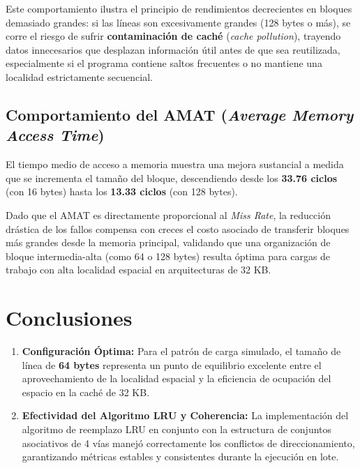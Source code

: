 \documentclass[12pt,a4paper]{article}
\begin{document}
Este comportamiento ilustra el principio de rendimientos decrecientes en bloques demasiado grandes: si las líneas son excesivamente grandes (128 bytes o más), se corre el riesgo de sufrir \textbf{contaminación de caché} (\textit{cache pollution}), trayendo datos innecesarios que desplazan información útil antes de que sea reutilizada, especialmente si el programa contiene saltos frecuentes o no mantiene una localidad estrictamente secuencial.

\subsection{Comportamiento del AMAT (\textit{Average Memory Access Time})}
El tiempo medio de acceso a memoria muestra una mejora sustancial a medida que se incrementa el tamaño del bloque, descendiendo desde los \textbf{33.76 ciclos} (con 16 bytes) hasta los \textbf{13.33 ciclos} (con 128 bytes).

Dado que el AMAT es directamente proporcional al \textit{Miss Rate}, la reducción drástica de los fallos compensa con creces el costo asociado de transferir bloques más grandes desde la memoria principal, validando que una organización de bloque intermedia-alta (como 64 o 128 bytes) resulta óptima para cargas de trabajo con alta localidad espacial en arquitecturas de 32 KB.

\section{Conclusiones}
\begin{enumerate}
    \item \textbf{Configuración Óptima:} Para el patrón de carga simulado, el tamaño de línea de \textbf{64 bytes} representa un punto de equilibrio excelente entre el aprovechamiento de la localidad espacial y la eficiencia de ocupación del espacio en la caché de 32 KB.
    \item \textbf{Efectividad del Algoritmo LRU y Coherencia:} La implementación del algoritmo de reemplazo LRU en conjunto con la estructura de conjuntos asociativos de 4 vías manejó correctamente los conflictos de direccionamiento, garantizando métricas estables y consistentes durante la ejecución en lote.
\end{enumerate}
\end{document}
